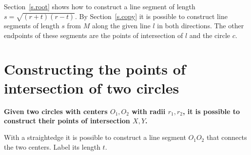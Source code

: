 Section~\ref{s.root} shows how to construct a line segment of length $s=\sqrt{(r+t)(r-t)}$. By Section~\ref{s.copy} it is possible to construct line segments of length $s$ from $M$ along the given line $l$ in both directions. The other endpoints of these segments are the points of intersection of $l$ and the circle $c$.


\section{Constructing the points of intersection of two circles}\label{s.two-circles}

\textbf{Given two circles with centers $O_1,O_2$ with radii $r_1,r_2$, it is possible to construct their points of intersection $X,Y$.}

With a straightedge it is possible to construct a line segment $O_1O_2$ that connects the two centers. Label its length $t$.

\begin{center}
\end{center}

